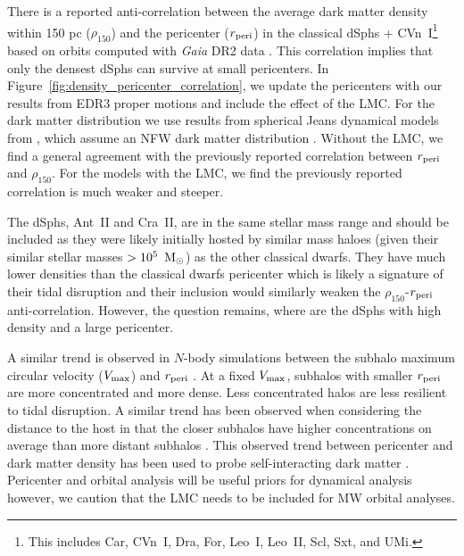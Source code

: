 \documentclass[twocolumn]{aastex63}
\begin{document}
There is a reported anti-correlation between the average dark matter density within 150 pc ($\rho_{150}$) and the pericenter ($r_{\rm peri}$) in the classical dSphs + CVn~I\footnote{This includes Car, CVn~I, Dra, For, Leo~I, Leo~II, Scl, Sxt, and UMi.}  based on orbits computed with  {\it Gaia} DR2 data \citep{Kaplinghat2019MNRAS.490..231K}. 
This correlation implies that only the densest dSphs can survive at small pericenters.
In Figure~\ref{fig:density_pericenter_correlation}, we update the pericenters with our results from EDR3 proper motions and include the effect of the LMC. 
For the dark matter distribution we use results from spherical Jeans dynamical models from \citet{Pace2019MNRAS.482.3480P}, which assume an NFW dark matter distribution \citep{Navarro1996ApJ...462..563N}. 
Without the LMC, we find a general agreement with the previously reported correlation between $r_{\rm peri}$ and $\rho_{150}$. 
For the models with the LMC, we find the previously reported correlation is much weaker and steeper. 


The  dSphs, Ant~II and Cra~II, are in the same stellar mass range and should be included as they were likely initially hosted by similar mass haloes (given their similar stellar masses $>10^5~\mathrm{\,M_\odot}$) as the other classical dwarfs.
They have much lower densities than the classical dwarfs  pericenter  which is likely a signature of their tidal disruption \citep[][]{Ji2021ApJ...921...32J, Vivas2022ApJ...926...78V} and their inclusion would similarly weaken the $\rho_{150}$-$r_{\rm peri}$ anti-correlation. 
However, the question remains, where are the dSphs with high density and a large pericenter. 



A similar trend is observed in $N$-body simulations between the subhalo maximum circular velocity ($V_{\rm max}$) and $r_{\rm peri}$  \citep{Robles2021MNRAS.503.5232R}.  At a fixed $V_{\rm max}$, subhalos with smaller  $r_{\rm peri}$ are more concentrated and more dense.  Less concentrated halos are less resilient to tidal disruption. 
A similar trend has been observed when considering the distance to the host in that the closer subhalos have higher concentrations on average than more distant subhalos  \citep{Moline2021arXiv211002097M}.  
This observed trend between pericenter and dark matter density has been used to  probe self-interacting dark matter  \citep[e.g.,][]{Jiang2021arXiv210803243J}. 
Pericenter and orbital analysis will be useful priors for dynamical analysis \citep{Robles2021MNRAS.503.5232R} however, we caution that the LMC needs to be included for MW orbital analyses.  
\end{document}
